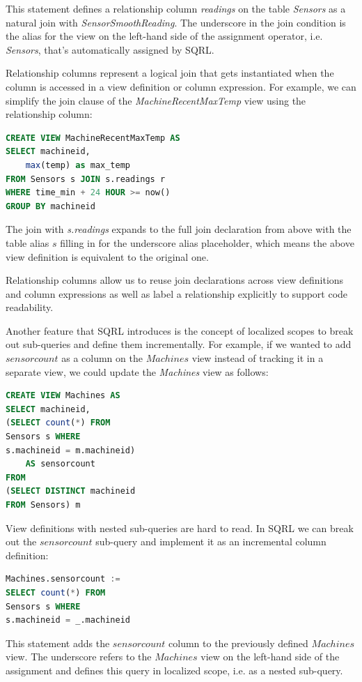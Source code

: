\documentclass[	DIV=calc,%
							paper=letter,%
							fontsize=11pt,%
							twocolumn]{scrartcl}	 					%
\begin{document}
This statement defines a relationship column \emph{readings} on the table \emph{Sensors} as a natural join with \emph{SensorSmoothReading}.
The underscore in the join condition is the alias for the view on the left-hand side of the assignment operator, i.e. \emph{Sensors}, that's automatically assigned by SQRL.

Relationship columns represent a logical join that gets instantiated when the column is accessed in a view definition or column expression. For example, we can simplify the join clause of the \emph{MachineRecentMaxTemp} view using the relationship column:
\begin{lstlisting}[language=SQL]
CREATE VIEW MachineRecentMaxTemp AS
SELECT machineid,
    max(temp) as max_temp
FROM Sensors s JOIN s.readings r
WHERE time_min + 24 HOUR >= now()
GROUP BY machineid
\end{lstlisting}

The join with \emph{s.readings} expands to the full join declaration from above with the table alias $s$ filling in for the underscore alias placeholder, which means the above view definition is equivalent to the original one.

Relationship columns allow us to reuse join declarations across view definitions and column expressions as well as label a relationship explicitly to support code readability.

Another feature that SQRL introduces is the concept of localized scopes to break out sub-queries and define them incrementally. For example, if we wanted to add $sensorcount$ as a column on the $Machines$ view instead of tracking it in a separate view, we could update the \emph{Machines} view as follows:

\begin{lstlisting}[language=SQL]
CREATE VIEW Machines AS
SELECT machineid,
(SELECT count(*) FROM
Sensors s WHERE
s.machineid = m.machineid)
    AS sensorcount
FROM
(SELECT DISTINCT machineid
FROM Sensors) m
\end{lstlisting}

View definitions with nested sub-queries are hard to read. In SQRL we can break out the $sensorcount$ sub-query and implement it as an incremental column definition:
\begin{lstlisting}[language=SQL]
Machines.sensorcount :=
SELECT count(*) FROM
Sensors s WHERE
s.machineid = _.machineid
\end{lstlisting}

This statement adds the $sensorcount$ column to the previously defined $Machines$ view. The underscore refers to the $Machines$ view on the left-hand side of the assignment and defines this query in localized scope, i.e. as a nested sub-query.
\end{document}
